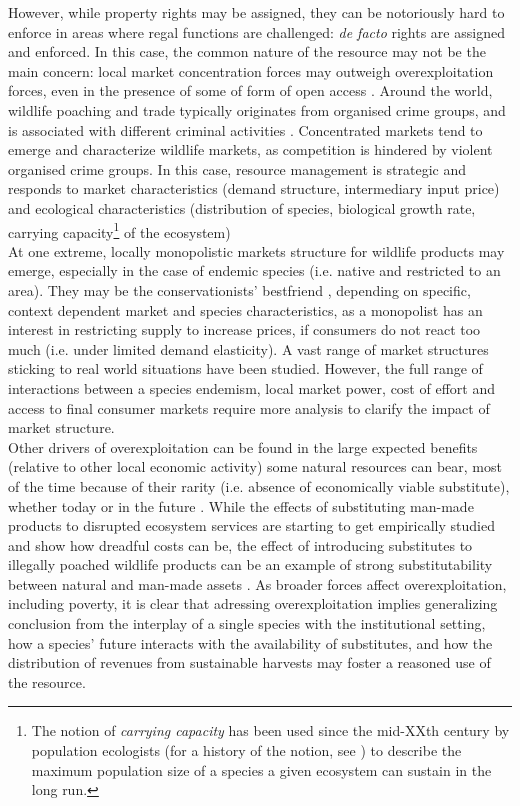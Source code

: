 	
	 However, while property rights may be assigned, they can be notoriously hard to enforce in areas where regal functions are challenged: \textit{de facto} rights are assigned and enforced. In this case, the common nature of the resource may not be the main concern: local market concentration forces may outweigh overexploitation forces, even in the presence of some of form of open access \citep{damania_economics_2007}. 
Around the world, wildlife poaching and trade typically originates from organised crime groups, and is associated with different criminal activities \citep{mozer_introduction_2023}.  Concentrated markets tend to emerge and characterize wildlife markets, as competition is hindered by violent organised crime groups. In this case, resource management is strategic and responds to market characteristics (demand structure, intermediary input price) and ecological characteristics (distribution of species, biological growth rate, carrying capacity\footnote{The notion of \textit{carrying capacity} has been used since the mid-XXth century by population ecologists (for a history of the notion, see \cite{sayre_carrying_2008}) to describe the maximum population size of a species a given ecosystem can sustain in the long run.} of the ecosystem)\\
	At one extreme, locally monopolistic markets structure for wildlife products may emerge, especially in the case of endemic species (i.e. native and restricted to an area).
They may be the conservationists' bestfriend \citep{solow_resources_1974, hannesson_note_1983}, depending on specific, context dependent market and species characteristics, as a monopolist has an interest in restricting supply to increase prices, if consumers do not react too much (i.e. under limited demand elasticity). A vast range of  market structures \citep{damania_economics_2007, hannesson_effects_1985} sticking to real world situations have been studied. However, the full range of interactions between a species endemism, local market power, cost of effort and access to final consumer markets require more analysis to clarify the impact of market structure.\\
	Other drivers of overexploitation can be found in the large expected benefits (relative to other local economic activity) some natural resources can bear, most of the time because of their rarity (i.e. absence of economically viable substitute), whether today or in the future \citep{Kremer2000}. While the effects of substituting man-made products to disrupted ecosystem services are starting to get empirically studied \citep{frank_economic_2024} and show how dreadful costs can be, the effect of introducing substitutes to illegally poached wildlife products can be an example of strong substitutability between natural and man-made assets \citep{chen_economics_2017}. As broader forces affect overexploitation, including poverty, it is clear that adressing overexploitation implies generalizing conclusion from the interplay of a single species with the institutional setting, how a  species' future interacts with the availability of substitutes, and how the distribution of revenues from sustainable harvests may foster a reasoned use of the resource. 
	
